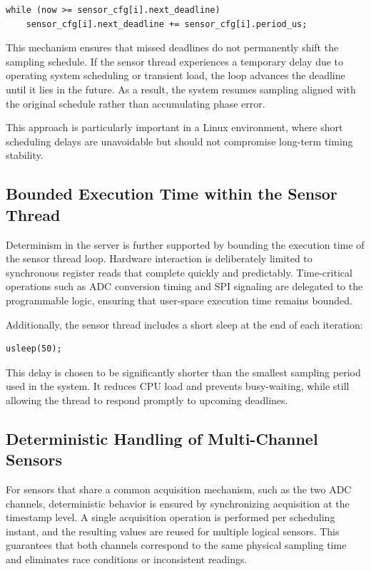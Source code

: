 \begin{verbatim}
while (now >= sensor_cfg[i].next_deadline)
    sensor_cfg[i].next_deadline += sensor_cfg[i].period_us;
\end{verbatim}

This mechanism ensures that missed deadlines do not permanently shift the sampling schedule. If the sensor thread experiences a temporary delay due to operating system scheduling or transient load, the loop advances the deadline until it lies in the future. As a result, the system resumes sampling aligned with the original schedule rather than accumulating phase error.

This approach is particularly important in a Linux environment, where short scheduling delays are unavoidable but should not compromise long-term timing stability.


\subsection{Bounded Execution Time within the Sensor Thread}
Determinism in the server is further supported by bounding the execution time of the sensor thread loop. Hardware interaction is deliberately limited to synchronous register reads that complete quickly and predictably. Time-critical operations such as ADC conversion timing and SPI signaling are delegated to the programmable logic, ensuring that user-space execution time remains bounded.

Additionally, the sensor thread includes a short sleep at the end of each iteration:

\begin{verbatim}
usleep(50);
\end{verbatim}

This delay is chosen to be significantly shorter than the smallest sampling period used in the system. It reduces CPU load and prevents busy-waiting, while still allowing the thread to respond promptly to upcoming deadlines.

\subsection{Deterministic Handling of Multi-Channel Sensors}
For sensors that share a common acquisition mechanism, such as the two ADC channels, deterministic behavior is ensured by synchronizing acquisition at the timestamp level. A single acquisition operation is performed per scheduling instant, and the resulting values are reused for multiple logical sensors. This guarantees that both channels correspond to the same physical sampling time and eliminates race conditions or inconsistent readings.

